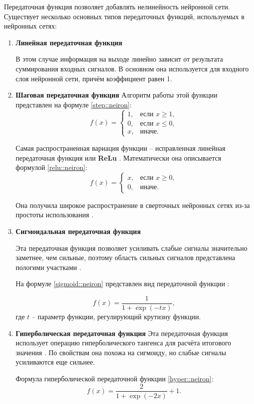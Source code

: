 Передаточная функция позволяет добавлять нелинейность нейронной сети.
Существует несколько основных типов передаточных функций, используемых в нейронных сетях:
\begin{enumerate}
	\item \textbf{Линейная передаточная функция}
	
	В этом случае информация на выходе линейно зависит от результата суммирования входных сигналов.
	В основном она используется для входного слоя нейронной сети, причём коэффициент равен 1.
	
	\item \textbf{Шаговая передаточная функция}
	Алгоритм работы этой функции представлен на формуле \ref{step::neiron}:
	\begin{equation}
		\label{step::neiron}
		f(x)= 
		\begin{cases}
			1,& \text{если } x \geq 1, \\
			0,& \text{если } x \leq 0, \\
			x, & \text{иначе.}
		\end{cases}
	\end{equation}

	Самая распространенная вариация функции -- исправленная линейная передаточная функция или \textbf{ReLu} \cite{relu}.
	Математически она описывается формулой \ref{relu::neiron}:
	\begin{equation}
		\label{relu::neiron}
				f(x)= 
		\begin{cases}
			x,& \text{если } x \geq 0, \\
			0,& \text{иначе.}
		\end{cases}
	\end{equation} 

	Она получила широкое распространение в сверточных нейронных сетях из-за простоты использования \cite{CNN_translate}.
	
	\item \textbf{Сигмоидальная передаточная функция}
	
	Эта передаточная функция позволяет усиливать слабые сигналы значительно заметнее, чем сильные, поэтому область сильных сигналов представлена пологими участками \cite{relu}.
	
	На формуле \ref{sigmoid::neiron} представлен вид передаточной функции \cite{CNN_translate}:
	
	\begin{equation}
		\label{sigmoid::neiron}
		f(x) = \frac{1}{1 + \exp(-tx)},
	\end{equation}
	где $t$ -- параметр функции, регулирующий крутизну функции.
	
	\item \textbf{Гиперболическая передаточная функция}
	Эта передаточная функция использует операцию гиперболического тангенса для расчёта итогового значения \cite{relu}.
	По свойствам она похожа на сигмоиду, но слабые сигналы усиливаются еще сильнее.
	
	Формула гиперболической передаточной функции \ref{hyper::neiron}:
	\begin{equation}
		\label{hyper::neiron}
		f(x) = \frac{2}{1 + \exp(-2x)} + 1.
	\end{equation}
\end{enumerate}

